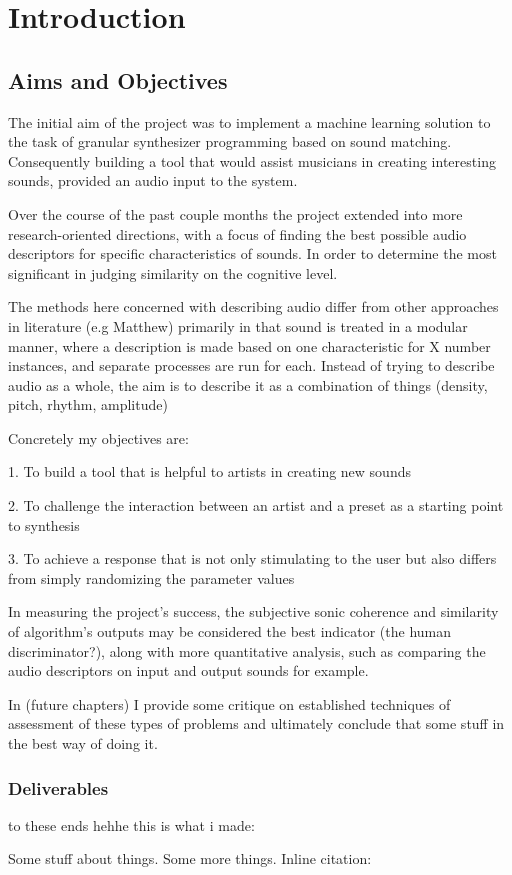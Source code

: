 \chapter{Introduction}
\label{chapterlabel1}

\section{Aims and Objectives}
The initial aim of the project was to implement a machine learning solution to
the task of granular synthesizer programming based on sound matching.
Consequently building a tool that would assist musicians in creating interesting
sounds, provided an audio input to the system.

Over the course of the past couple months the project extended into more
research-oriented directions, with a focus of finding the best possible audio
descriptors for specific characteristics of sounds. In order to determine the
most significant in judging similarity on the cognitive level.

The methods here concerned with describing audio differ from other approaches in
literature (e.g Matthew) primarily in that sound is treated in a modular manner,
where a description is made based on one characteristic for X number instances,
and separate processes are run for each. Instead of trying to describe audio as
a whole, the aim is to describe it as a combination of things (density, pitch,
rhythm, amplitude)

Concretely my objectives are:

1. To build a tool that is helpful to artists in creating new sounds 

2. To challenge the interaction between an artist and a preset as a starting
point to synthesis 

3. To achieve a response that is not only stimulating to the user but also differs
from simply randomizing the parameter values 

In measuring the project's success, the subjective sonic coherence and
similarity of algorithm's outputs may be considered the best indicator (the
human discriminator?), along with more quantitative analysis, such as comparing
the audio descriptors on input and output sounds for example.

In (future chapters) I provide some critique on established techniques of
assessment of these types of problems and ultimately conclude that some stuff in
the best way of doing it.

\subsection{Deliverables}
to these ends hehhe this is what i made:

Some stuff about things.
Some more things. 
Inline citation:
